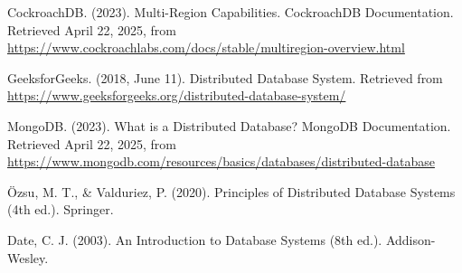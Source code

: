\documentclass[twoside]{article}
\begin{document}
\begin{thebibliography}{9}
  CockroachDB. (2023). Multi-Region Capabilities. CockroachDB Documentation. Retrieved April 22, 2025, from \url{https://www.cockroachlabs.com/docs/stable/multiregion-overview.html}
  
  GeeksforGeeks. (2018, June 11). Distributed Database System. Retrieved from \url{https://www.geeksforgeeks.org/distributed-database-system/}
  
  MongoDB. (2023). What is a Distributed Database? MongoDB Documentation. Retrieved April 22, 2025, from \url{https://www.mongodb.com/resources/basics/databases/distributed-database}
  
  Özsu, M. T., \& Valduriez, P. (2020). Principles of Distributed Database Systems (4th ed.). Springer.
  
  Date, C. J. (2003). An Introduction to Database Systems (8th ed.). Addison-Wesley.
\end{thebibliography}
\end{document}
